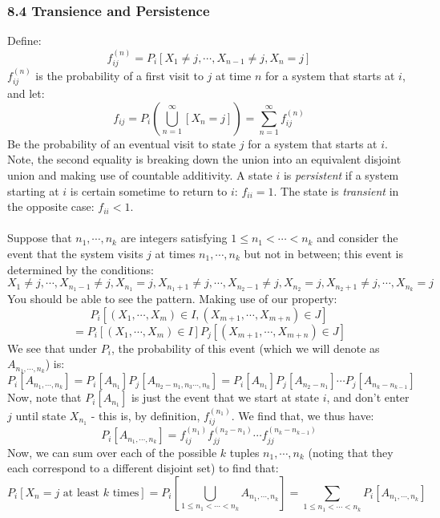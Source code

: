 \documentclass[12pt,a4paper]{article}
\newcommand{\1}[1]{\mathbbm{1}\left\{ #1 \right\}}
\begin{document}
\subsubsection{8.4 Transience and Persistence}
Define:
$$
	f_{ij}^{(n)} =
	P_i\left[X_1 \neq j, \cdots, X_{n-1} \neq j, X_n = j\right]
$$
$f_{ij}^{(n)}$ is the probability of a first visit to $j$ at time $n$ for a system that starts at $i$, and let:
$$
	f_{ij} = P_i\left(\bigcup_{n=1}^\infty [X_n = j]\right) = \sum_{n=1}^\infty f_{ij}^{(n)}
$$
Be the probability of an eventual visit to state $j$ for a system that starts at $i$. Note, the second equality is breaking down the union into an equivalent disjoint union and making use of countable additivity. A state $i$ is \textit{persistent} if a system starting at $i$ is certain sometime to return to $i$: $f_{ii} = 1$. The state is \textit{transient} in the opposite case: $f_{ii} < 1$.
\\\\
Suppose that $n_1, \cdots, n_k$ are integers satisfying $1 \leq n_1 < \cdots < n_k$ and consider the event that the system visits $j$ at times $n_1, \cdots, n_k$ but not in between; this event is determined by the conditions:
$$
	X_1 \neq j, \cdots, X_{n_1 - 1} \neq j, X_{n_1} = j, X_{n_1 + 1} \neq j, \cdots, X_{n_2-1} \neq j, X_{n_2} = j,
	X_{n_2 + 1} \neq j, \cdots, X_{n_k} = j
$$
You should be able to see the pattern. Making use of our property:
$$
	P_i\left[(X_1, \cdots, X_m) \in I, (X_{m+1}, \cdots, X_{m + n}) \in J\right]
$$
$$
	=
	P_i\left[(X_1, \cdots, X_m) \in I\right]
	P_j\left[(X_{m+1}, \cdots, X_{m + n}) \in J\right]
$$
We see that under $P_i$, the probability of this event (which we will denote as $A_{n_1, \cdots, n_k}$) is:
$$
	P_i\left[A_{n_1, \cdots, n_k}\right] =
	P_i\left[A_{n_1}\right]P_j\left[A_{n_2 - n_1, n_3 \cdots, n_k}\right] =
	P_i\left[A_{n_1}\right]P_j\left[A_{n_2 - n_1}\right] \cdots P_j\left[A_{n_k - n_{k-1}}\right]
$$
Now, note that $P_i\left[A_{n_1}\right]$ is just the event that we start at state $i$, and don't enter $j$ until state $X_{n_1}$ - this is, by definition, $f_{ij}^{(n_1)}$. We find that, we thus have:
$$
	P_i\left[A_{n_1, \cdots, n_k}\right] = f_{ij}^{(n_1)}f_{jj}^{(n_2 - n_1)} \cdots f_{jj}^{(n_k - n_{k-1})}
$$
Now, we can sum over each of the possible $k$ tuples $n_1, \cdots, n_k$ (noting that they each correspond to a different disjoint set) to find that:
$$
	P_i\left[X_n = j \text{ at least $k$ times}\right] = 
	P_i\left[\bigcup_{1 \leq n_1 < \cdots < n_k} A_{n_1, \cdots, n_k}\right] =
	\sum_{1 \leq n_1 < \cdots < n_k} P_i\left[A_{n_1, \cdots, n_k}\right]
$$
\end{document}
